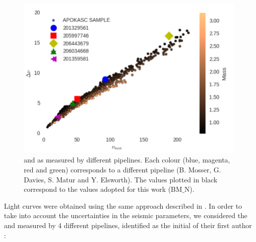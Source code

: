 \documentclass{aa}
\begin{document}
\begin{figure}
\centering
\includegraphics[width=1.7\columnwidth]{./Figures/dnunumax.pdf}
\caption{\Dnu and \numax as measured by different pipelines. Each colour (blue, magenta, red and green) corresponds to a different pipeline (B. Mosser, G. Davies, S. Matur and Y. Elsworth). The values plotted in black correspond to the values adopted for this work (BM$\_$N). }
\label{Fig:seismopipelines}%
\end{figure}
Light curves were obtained using the same approach described in \cite{Valentini2017}. In order to take into account the uncertainties in the seismic parameters, we considered the \deltanu and \numax measured by 4 different pipelines, identified as the initial of their first author :
\end{document}
